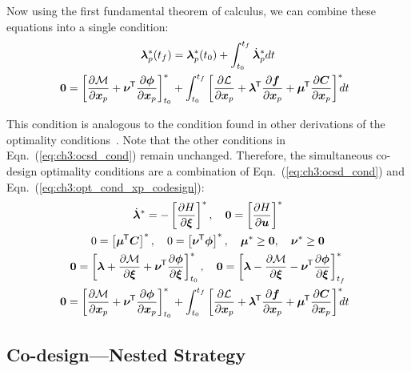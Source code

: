 \noindent Now using the first fundamental theorem of calculus, we can combine these equations into a single condition:
\begin{subequations}
\begin{gather}
\blambda^*_p(t_f) = \blambda^*_p(t_0) + \int_{t_0}^{t_f} \dot{\blambda}^*_p dt \\
\hspace*{-0.08in} \bzero = \left[ \pd{\mayer}{\bxp} + \bnu\tran \pd{\bm{\phi}}{\bxp} \right]_{t_0}^* + \int_{t_0}^{t_f} \left[ \pd{\lagrange}{\bxp}  + \blambda\tran \pd{\bfd}{\bxp} + \bmu\tran \pd{\bm{C}}{\bxp} \right]^* \hspace*{-0.07in} dt \label{eq:ch3:opt_cond_xp_codesign}
\end{gather}
\end{subequations}

\noindent This condition is analogous to the condition found in other derivations of the optimality conditions~\cite{Fathy2001a, Dolezal1981a}.
Note that the other conditions in Eqn.~(\ref{eq:ch3:ocsd_cond}) remain unchanged.
Therefore, the simultaneous co-design optimality conditions are a combination of Eqn.~(\ref{eq:ch3:ocsd_cond}) and Eqn.~(\ref{eq:ch3:opt_cond_xp_codesign}):
\begingroup
\allowdisplaybreaks
\begin{subequations}
\label{eq:ch3:opt_cond_sim}
\begin{gather}
\dot{\blambda}^* = - \left[ \pd{H}{\bxi} \right]^*, \quad 
\bzero = \left[ \pd{H}{\bu} \right]^* \\
0 = \left[ \bmu\tran \bm{C}\right]^*, \quad 0 = \left[ \bnu\tran \bm{\phi} \right]^*, \quad \bmu^* \geq \bzero, \quad \bnu^* \geq \bzero \\
\bzero = \left[ \blambda + \pd{\mayer}{\bxi} + \bnu\tran \pd{\bm{\phi}}{\bxi} \right]_{t_0}^*, \quad
\bzero = \left[ \blambda - \pd{\mayer}{\bxi} - \bnu\tran \pd{\bm{\phi}}{\bxi} \right]_{t_f}^* \\
\hspace*{-0.08in} \bzero = \left[ \pd{\mayer}{\bxp} + \bnu\tran \pd{\bm{\phi}}{\bxp} \right]_{t_0}^* + \int_{t_0}^{t_f} \left[ \pd{\lagrange}{\bxp}  + \blambda\tran \pd{\bfd}{\bxp} + \bmu\tran \pd{\bm{C}}{\bxp} \right]^* \hspace*{-0.07in}  dt
\end{gather}
\end{subequations}
\endgroup

\subsection{Co-design---Nested Strategy}

